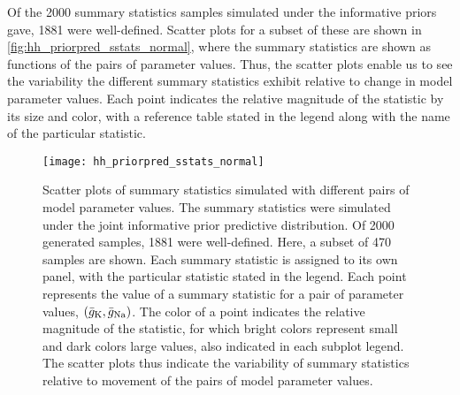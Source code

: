 Of the 2000 summary statistics samples simulated under the informative priors gave, 1881 were well-defined. Scatter plots for a subset of these are shown in \autoref{fig:hh_priorpred_sstats_normal}, where the summary statistics are shown as functions of the pairs of parameter values. Thus, the scatter plots enable us to see the variability the different summary statistics exhibit relative to change in model parameter values. Each point indicates the relative magnitude of the statistic by its size and color, with a reference table stated in the legend along with the name of the particular statistic.
\begin{figure}[H]
    \centering
    \texttt{[image: hh\_priorpred\_sstats\_normal]}
    \caption{Scatter plots of summary statistics simulated with different pairs of model parameter values. The summary statistics were simulated under the joint informative prior predictive distribution. Of 2000 generated samples, 1881 were well-defined. Here, a subset of 470 samples are shown. Each summary statistic is assigned to its own panel, with the particular statistic stated in the legend. Each point represents the value of a summary statistic for a pair of parameter values, $\qty(\bar{g}_{\mathrm{K}}, \bar{g}_{\mathrm{Na}})$. The color of a point indicates the relative magnitude of the statistic, for which bright colors represent small and dark colors large values, also indicated in each subplot legend. The scatter plots thus indicate the variability of summary statistics relative to movement of the pairs of model parameter values.
    }
    \label{fig:hh_priorpred_sstats_normal}
\end{figure} 
